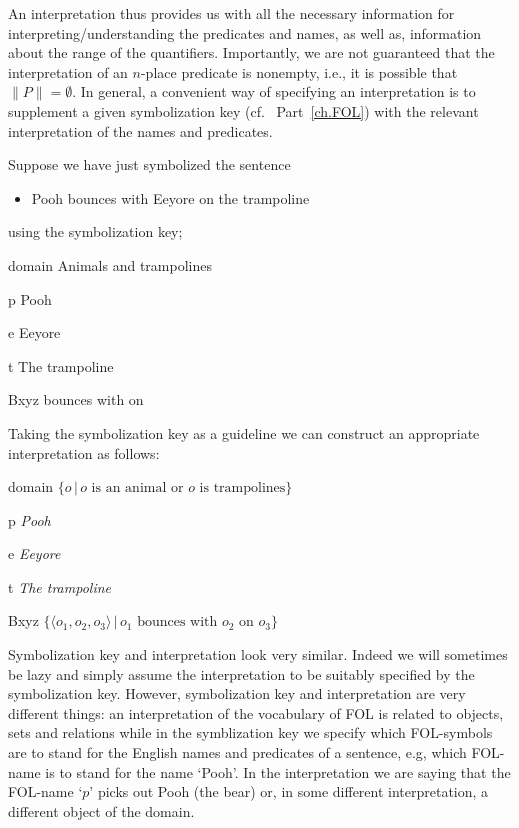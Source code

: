 An interpretation thus provides us with all the necessary information for interpreting/understanding the predicates and names, as well as, information about the range of the quantifiers. Importantly, we are not guaranteed that the interpretation of an $n$-place predicate is nonempty, i.e., it is possible that $\|P\|=\emptyset$. In general, a convenient way of specifying an interpretation is to supplement a given symbolization key (cf.~ Part~\ref{ch.FOL}) with the relevant interpretation of the names and predicates.

Suppose we have just symbolized the sentence
\begin{itemize}
\item Pooh bounces with Eeyore on the trampoline
\end{itemize}
using the symbolization key;
\begin{ekey}
\item[domain]Animals and trampolines
\item[p]Pooh
\item[e]Eeyore
\item[t]The trampoline
\item[Bxyz] bounces with  on 
\end{ekey}
Taking the symbolization key as a guideline we can construct an appropriate interpretation as follows:
\begin{ekey}
\item[domain]$\{o\,|\,o\text{ is an animal or }o\text{ is trampolines}\}$
\item[p]\emph{Pooh}
\item[e]\emph{Eeyore}
\item[t]\emph{The trampoline}
\item[Bxyz]$\{\langle o_1,o_2,o_3\rangle\,|\,o_1\text{ bounces with }o_2\text{ on }o_3\}$
\end{ekey}
Symbolization key and interpretation look very similar. Indeed we will sometimes be lazy and simply assume the interpretation to be suitably specified by the symbolization key. However, symbolization key and interpretation are very different things: an interpretation of the vocabulary of FOL is related to objects, sets and relations while in the symblization key we specify which FOL-symbols are to stand for the English names and predicates of a sentence, e.g, which FOL-name is to stand for the name `Pooh'. In the interpretation we are saying that the FOL-name `$p$' picks out Pooh (the bear) or, in some different interpretation, a different object of the domain. 

